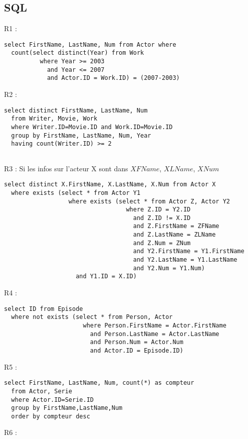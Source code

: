 \documentclass[a4paper,12pt]{article}
\begin{document}
\subsection{SQL}
\begin{list}{-}{}
  \item R1 :
    \begin{lstlisting}
select FirstName, LastName, Num from Actor where
  count(select distinct(Year) from Work
          where Year >= 2003 
            and Year <= 2007
            and Actor.ID = Work.ID) = (2007-2003)

    \end{lstlisting}
  \item R2 :
    \begin{lstlisting}
select distinct FirstName, LastName, Num
  from Writer, Movie, Work
  where Writer.ID=Movie.ID and Work.ID=Movie.ID
  group by FirstName, LastName, Num, Year
  having count(Writer.ID) >= 2
    
    \end{lstlisting}
  \item R3 :
    Si les infos sur l'acteur X sont dans $XFName$, $XLName$, $XNum$
    \begin{lstlisting}
select distinct X.FirstName, X.LastName, X.Num from Actor X
  where exists (select * from Actor Y1
                  where exists (select * from Actor Z, Actor Y2 
                                  where Z.ID = Y2.ID
                                    and Z.ID != X.ID
                                    and Z.FirstName = ZFName
                                    and Z.LastName = ZLName
                                    and Z.Num = ZNum
                                    and Y2.FirstName = Y1.FirstName
                                    and Y2.LastName = Y1.LastName
                                    and Y2.Num = Y1.Num)
                    and Y1.ID = X.ID)
    \end{lstlisting}
  \item R4 :
    \begin{lstlisting}
select ID from Episode
  where not exists (select * from Person, Actor
                      where Person.FirstName = Actor.FirstName
                        and Person.LastName = Actor.LastName
                        and Person.Num = Actor.Num
                        and Actor.ID = Episode.ID)
    \end{lstlisting}
  \item R5 :
    \begin{lstlisting}
select FirstName, LastName, Num, count(*) as compteur
  from Actor, Serie
  where Actor.ID=Serie.ID
  group by FirstName,LastName,Num
  order by compteur desc
    \end{lstlisting}
  \item R6 :
    \begin{lstlisting}
    \end{lstlisting}

\end{list}
\end{document}
